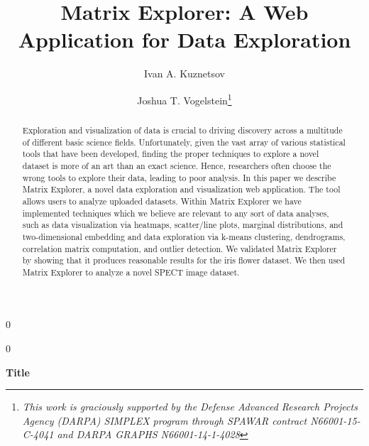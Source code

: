 \documentclass[12pt]{article}
\newcommand{\blind}{0}
\begin{document}
%

\def\spacingset#1{\renewcommand{\baselinestretch}%
{#1}\small\normalsize} \spacingset{1}
\setlength{\parindent}{5ex}


\blind
{
  \title{\bf Matrix Explorer: A Web Application for Data Exploration}
  \author[1]{Ivan A. Kuznetsov}
  \author[1,2]{Joshua T. Vogelstein\thanks{\textit{This work is graciously supported by the Defense Advanced Research Projects Agency (DARPA) SIMPLEX program through SPAWAR contract N66001-15-C-4041 and DARPA GRAPHS N66001-14-1-4028}}}
  \maketitle
} \fi

\blind
{
  \bigskip
  \bigskip
  \begin{center}
    {\LARGE\bf Title}
\end{center}
  \medskip
} \fi

\bigskip
\begin{abstract}
\noindent Exploration and visualization of data is crucial to driving discovery across a multitude of different basic science fields. Unfortunately, given the vast array of various statistical tools that have been developed, finding the proper techniques to explore a novel dataset is more of an art than an exact science. Hence, researchers often choose the wrong tools to explore their data, leading to poor analysis. In this paper we describe Matrix Explorer, a novel data exploration and visualization web application. The tool allows users to analyze uploaded datasets. Within Matrix Explorer we have implemented techniques which we believe are relevant to any sort of data analyses, such as data visualization via heatmaps, scatter/line plots, marginal distributions, and two-dimensional embedding and data exploration via k-means clustering, dendrograms, correlation matrix computation, and outlier detection. We validated Matrix Explorer by showing that it produces reasonable results for the iris flower dataset. We then used Matrix Explorer to analyze a novel SPECT image dataset.
\end{abstract}
\end{document}

